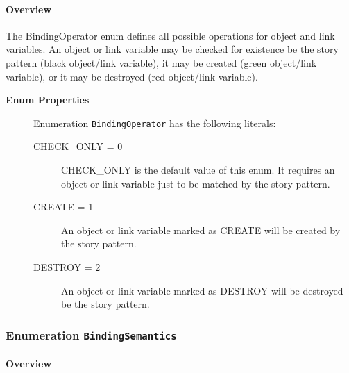 \paragraph{Overview}
	
			
The BindingOperator enum defines all possible operations for object and link variables. An object or link variable may be checked for existence be the story pattern (black object/link variable), it may be created (green object/link variable), or it may be destroyed (red object/link variable).	
		
	


\begin{description}

	\item[\textbf{Enum Properties}] Enumeration \texttt{BindingOperator} has the following literals:

	\begin{description}
		
		\item[CHECK\_ONLY = 0]
		\hspace{\fill}
		\nopagebreak
		
CHECK\_ONLY is the default value of this enum. It requires an object or link variable just to be matched by the story pattern.	

		\item[CREATE = 1]
		\hspace{\fill}
		\nopagebreak
		
An object or link variable marked as CREATE will be created by the story pattern.	

		\item[DESTROY = 2]
		\hspace{\fill}
		\nopagebreak
		
An object or link variable marked as DESTROY will be destroyed be the story pattern.	
 
	\end{description}

\end{description}



\subsubsection{\Large{Enumeration \bfseries \texttt{BindingSemantics}\normalfont}}
\label{cls:modeling::patterns::BindingSemantics} 
\paragraph{Overview}
	
